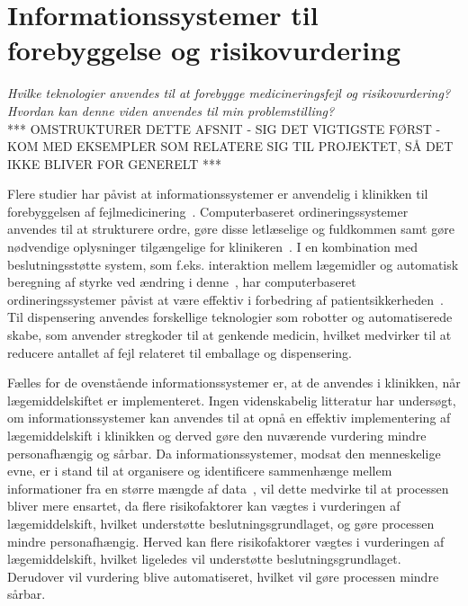 \section{Informationssystemer til forebyggelse og risikovurdering}
\textit{Hvilke teknologier anvendes til at forebygge medicineringsfejl og risikovurdering? Hvordan kan denne viden anvendes til min problemstilling?} \\

*** OMSTRUKTURER DETTE AFSNIT - SIG DET VIGTIGSTE FØRST - KOM MED EKSEMPLER SOM RELATERE SIG TIL PROJEKTET, SÅ DET IKKE BLIVER FOR GENERELT ***

Flere studier har påvist at informationssystemer er anvendelig i klinikken til forebyggelsen af fejlmedicinering~\citep{Agrawal2009, Kaushal2002, Stenner2010, Fischer2008, Simpson2008, Bates2000a}. Computerbaseret ordineringssystemer anvendes til at strukturere ordre, gøre disse letlæselige og fuldkommen samt gøre nødvendige oplysninger tilgængelige for klinikeren~\citep{Agrawal2009,Bates2000a}. I en kombination med beslutningsstøtte system, som f.eks. interaktion mellem lægemidler og automatisk beregning af styrke ved ændring i denne~\citep{Agrawal2009}, har computerbaseret ordineringssystemer påvist at være effektiv i forbedring af patientsikkerheden~\citep{Agrawal2009, Bates2000a}. Til dispensering anvendes forskellige teknologier som robotter og automatiserede skabe, som anvender stregkoder til at genkende medicin, hvilket medvirker til at reducere antallet af fejl relateret til emballage og dispensering.~\citep{Agrawal2009}

Fælles for de ovenstående informationssystemer er, at de anvendes i klinikken, når lægemiddelskiftet er implementeret. Ingen videnskabelig litteratur har undersøgt, om informationssystemer kan anvendes til at opnå en effektiv implementering af lægemiddelskift i
klinikken og derved gøre den nuværende vurdering mindre personafhængig og sårbar.
Da informationssystemer, modsat den menneskelige evne, er i stand til at organisere og identificere sammenhænge mellem informationer fra en større mængde af data~\citep{Agrawal2009}, vil dette medvirke til at processen bliver mere ensartet, da flere risikofaktorer kan vægtes i vurderingen af lægemiddelskift, hvilket understøtte beslutningsgrundlaget, og gøre processen mindre personafhængig. Herved kan flere risikofaktorer vægtes i vurderingen af lægemiddelskift, hvilket ligeledes vil understøtte beslutningsgrundlaget. Derudover vil vurdering blive automatiseret, hvilket vil gøre processen mindre sårbar. 

